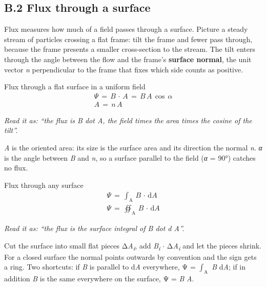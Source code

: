 \documentclass[11pt]{article}
\begin{document}
\begin{keepsection}
\section{B.2 Flux through a surface}

Flux measures how much of a field passes through a surface. Picture a steady stream of particles crossing a flat frame: tilt the frame and fewer pass through, because the frame presents a smaller cross-section to the stream. The tilt enters through the angle between the flow and the frame's \textbf{surface normal}, the unit vector \textit{n} perpendicular to the frame that fixes which side counts as positive.

\begin{equationcard}{Flux through a flat surface in a uniform field}
\[ \begin{gathered} Ψ\, =\, {B}\, \cdot \, {A}\, =\, {B}\, {A}\, \cos \, {α} \\ {A}\, =\, {n}\, {A} \end{gathered} \]
{\small \emph{Read it as: “the flux is B dot A, the field times the area times the cosine of the tilt”.}\par \textit{A} is the oriented area: its size is the surface area and its direction the normal \textit{n}. \textit{α} is the angle between \textit{B} and \textit{n}, so a surface parallel to the field (\textit{α} = 90°) catches no flux.}
\end{equationcard}

\begin{equationcard}{Flux through any surface}
\[ \begin{gathered} Ψ\, =\, \int_{\mathrm{A}} \, {B}\, \cdot \, \mathrm{d}{A} \\ Ψ\, =\, \oiint_{\mathrm{A}} \, {B}\, \cdot \, \mathrm{d}{A} \end{gathered} \]
{\small \emph{Read it as: “the flux is the surface integral of B dot d A”.}\par Cut the surface into small flat pieces Δ\textit{A}\textsubscript{\textit{i}}, add \textit{B}\textsubscript{\textit{i}} \ensuremath{\cdot} Δ\textit{A}\textsubscript{\textit{i}} and let the pieces shrink. For a closed surface the normal points outwards by convention and the sign gets a ring. Two shortcuts: if \textit{B} is parallel to d\textit{A} everywhere, Ψ = $\int_{\mathrm{A}} $ \textit{B} d\textit{A}; if in addition \textit{B} is the same everywhere on the surface, Ψ = \textit{B} \textit{A}.}
\end{equationcard}


\end{keepsection}
\end{document}
